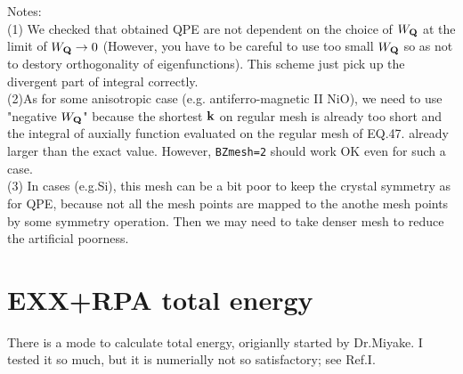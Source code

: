 \documentclass[a4paper,10pt,epsf,fleqn]{article}
\newcommand{\bfk}{{\bf k}}
\newcommand{\bfQ}{{\bf Q}}
\begin{document}
\noindent Notes:\\ 
(1) We checked that obtained QPE are not dependent
on the choice of $W_\bfQ$ at the limit of $W_\bfQ \to 0$
(However, you have to be careful to use too small $W_\bfQ$
so as not to destory orthogonality of eigenfunctions).
This scheme just pick up the divergent part of 
integral correctly.\\
(2)As for some anisotropic case (e.g. antiferro-magnetic II NiO),
we need to use "negative $W_\bfQ$" because the shortest $\bfk$ on regular mesh
is already too short and the integral of auxially function evaluated
on the regular mesh of EQ.47. already larger 
than the exact value. However, {\tt BZmesh=2} should work OK 
even for such a case.\\
(3) In cases (e.g.Si), this mesh can be a bit poor
to keep the crystal symmetry as for QPE, because not all the mesh points are 
mapped to the anothe mesh points by some symmetry operation.
Then we may need to take denser mesh to reduce the artificial poorness.




\section{EXX+RPA total energy}
There is a mode to calculate total energy, origianlly started by Dr.Miyake.
I tested it so much, but it is numerially not so satisfactory;
see Ref.I.
\end{document}
